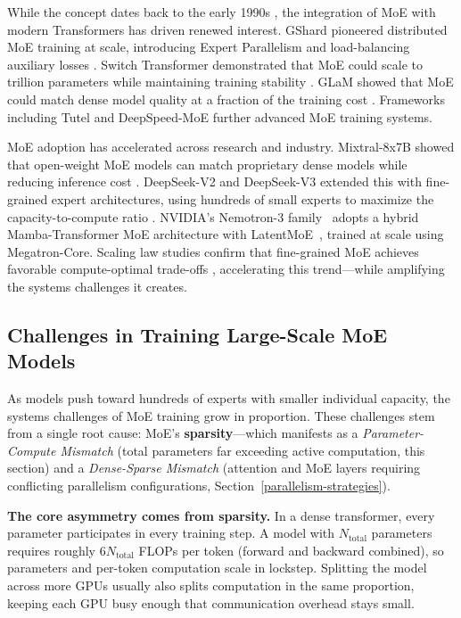 While the concept dates back to the early 1990s \cite{jacobs1991adaptive,eigen2013learning}, the integration of MoE with modern Transformers has driven renewed interest. GShard pioneered distributed MoE training at scale, introducing Expert Parallelism and load-balancing auxiliary losses \cite{lepikhin2020gshard}. Switch Transformer demonstrated that MoE could scale to trillion parameters while maintaining training stability \cite{fedus2022switchtransformersscalingtrillion}. GLaM showed that MoE could match dense model quality at a fraction of the training cost \cite{du2022glamefficientscalinglanguage}. Frameworks including Tutel \cite{hwang2023tutel} and DeepSpeed-MoE \cite{rajbhandari2022deepspeedmoe} further advanced MoE training systems.

MoE adoption has accelerated across research and industry. Mixtral-8x7B showed that open-weight MoE models can match proprietary dense models while reducing inference cost \cite{jiang2024mixtralexperts}. DeepSeek-V2 and DeepSeek-V3 extended this with fine-grained expert architectures, using hundreds of small experts to maximize the capacity-to-compute ratio \cite{dai2024deepseekmoe,deepseekai2024deepseekv2strongeconomicalefficient,deepseekai2025deepseekv3technicalreport}. NVIDIA's Nemotron-3 family~\cite{nvidia2025nemotron3} adopts a hybrid Mamba-Transformer MoE architecture with LatentMoE~\cite{elango2026latentmoe}, trained at scale using Megatron-Core. Scaling law studies confirm that fine-grained MoE achieves favorable compute-optimal trade-offs \cite{krajewski2024scaling,ludziejewski2025jointmoescalinglaws}, accelerating this trend---while amplifying the systems challenges it creates.

\subsection{Challenges in Training Large-Scale MoE Models}\label{sec:challenges}

As models push toward hundreds of experts with smaller individual capacity, the systems challenges of MoE training grow in proportion. These challenges stem from a single root cause: MoE's \textbf{sparsity}---which manifests as a \emph{Parameter-Compute Mismatch} (total parameters far exceeding active computation, this section) and a \emph{Dense-Sparse Mismatch} (attention and MoE layers requiring conflicting parallelism configurations, Section~\ref{parallelism-strategies}).

\textbf{The core asymmetry comes from sparsity.} In a dense transformer, every parameter participates in every training step. A model with $N_{\text{total}}$ parameters requires roughly $6 N_{\text{total}}$ FLOPs per token (forward and backward combined), so parameters and per-token computation scale in lockstep. Splitting the model across more GPUs usually also splits computation in the same proportion, keeping each GPU busy enough that communication overhead stays small.

